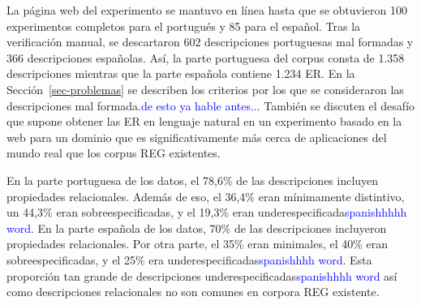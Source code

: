 

La p\'agina web del experimento se mantuvo en l\'{i}nea hasta que se obtuvieron 100 experimentos completos para el portugu\'es y 85  para el espa\~nol. Tras la verificaci\'on manual, se descartaron 602 descripciones portuguesas mal formadas y 366 descripciones espa\~nolas. As\'{i}, la parte portuguesa del corpus consta de 1.358 descripciones mientras que la parte espa\~nola contiene 1.234 ER. En la Secci\'on~\ref{sec-problemas} se describen los criterios por los que se consideraron las descripciones mal formada.\textcolor{blue}{de esto ya hable antes...} Tambi\'en se discuten el desaf\'{i}o que supone obtener las ER en lenguaje natural en un experimento basado en la web para un dominio que es significativamente m\'as cerca de aplicaciones del mundo real que los corpus REG existentes.

En la parte portuguesa de los datos, el 78,6\% de las descripciones incluyen propiedades relacionales. Adem\'as de eso, el 36,4\% eran m\'{i}nimamente distintivo, un 44,3\% eran sobreespecificadas, y el 19,3\% eran underespecificada\textcolor{blue}{spanishhhhh word}. En la parte espa\~nola de los datos, 70\% de las descripciones incluyeron propiedades relacionales. Por otra parte, el 35\% eran minimales, el 40\% eran sobreespecificadas, y el 25\% era underespecificadas\textcolor{blue}{spanishhhh word}. 
Esta proporci\'on tan grande de descripciones underespecificadas\textcolor{blue}{spanishhhh word} as\'{i} como descripciones relacionales no son comunes en corpora REG existente.


